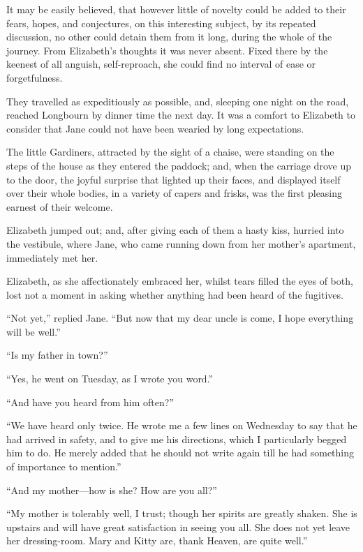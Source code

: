\documentclass[12pt,english]{book}
\begin{document}
\bigskip{} It may be easily believed, that however little of novelty
could be added to their fears, hopes, and conjectures, on this interesting
subject, by its repeated discussion, no other could detain them from
it long, during the whole of the journey. From Elizabeth's thoughts
it was never absent. Fixed there by the keenest of all anguish, self-reproach,
she could find no interval of ease or forgetfulness.

They travelled as expeditiously as possible, and, sleeping one night
on the road, reached Longbourn by dinner time the next day. It was
a comfort to Elizabeth to consider that Jane could not have been wearied
by long expectations.

The little Gardiners, attracted by the sight of a chaise, were standing
on the steps of the house as they entered the paddock; and, when the
carriage drove up to the door, the joyful surprise that lighted up
their faces, and displayed itself over their whole bodies, in a variety
of capers and frisks, was the first pleasing earnest of their welcome.

Elizabeth jumped out; and, after giving each of them a hasty kiss,
hurried into the vestibule, where Jane, who came running down from
her mother's apartment, immediately met her.

Elizabeth, as she affectionately embraced her, whilst tears filled
the eyes of both, lost not a moment in asking whether anything had
been heard of the fugitives.

{}``Not yet,'' replied Jane. {}``But now that my dear uncle is
come, I hope everything will be well.''

{}``Is my father in town?''\ 

{}``Yes, he went on Tuesday, as I wrote you word.''

{}``And have you heard from him often?''\ 

{}``We have heard only twice. He wrote me a few lines on Wednesday
to say that he had arrived in safety, and to give me his directions,
which I particularly begged him to do. He merely added that he should
not write again till he had something of importance to mention.''

{}``And my mother\mbox{---}how is she? How are you all?''\ 

{}``My mother is tolerably well, I trust; though her spirits are
greatly shaken. She is upstairs and will have great satisfaction in
seeing you all. She does not yet leave her dressing-room. Mary and
Kitty are, thank Heaven, are quite well.''
\end{document}
